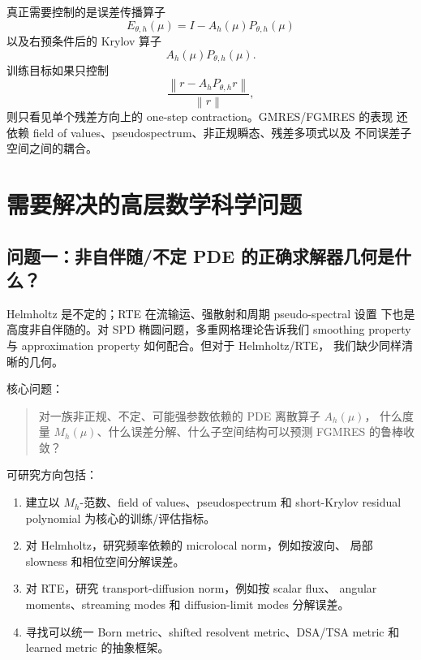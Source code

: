 \documentclass[UTF8,11pt,fontset=fandol]{ctexart}
\newcommand{\norm}[1]{\left\lVert #1 \right\rVert}
\begin{document}
真正需要控制的是误差传播算子
\begin{equation}
  E_{\theta,h}(\mu) = I - A_h(\mu) P_{\theta,h}(\mu)
\end{equation}
以及右预条件后的 Krylov 算子
\begin{equation}
  A_h(\mu) P_{\theta,h}(\mu).
\end{equation}
训练目标如果只控制
\begin{equation}
  \frac{\norm{r-A_hP_{\theta,h}r}}{\norm r},
\end{equation}
则只看见单个残差方向上的 one-step contraction。GMRES/FGMRES 的表现
还依赖 field of values、pseudospectrum、非正规瞬态、残差多项式以及
不同误差子空间之间的耦合。

\section{需要解决的高层数学科学问题}

\subsection{问题一：非自伴随/不定 PDE 的正确求解器几何是什么？}

Helmholtz 是不定的；RTE 在流输运、强散射和周期 pseudo-spectral 设置
下也是高度非自伴随的。对 SPD 椭圆问题，多重网格理论告诉我们 smoothing
property 与 approximation property 如何配合。但对于 Helmholtz/RTE，
我们缺少同样清晰的几何。

核心问题：
\begin{quote}
  对一族非正规、不定、可能强参数依赖的 PDE 离散算子 \(A_h(\mu)\)，
  什么度量 \(M_h(\mu)\)、什么误差分解、什么子空间结构可以预测
  FGMRES 的鲁棒收敛？
\end{quote}

可研究方向包括：
\begin{enumerate}[leftmargin=2em]
  \item 建立以 \(M_h\)-范数、field of values、pseudospectrum 和
  short-Krylov residual polynomial 为核心的训练/评估指标。
  \item 对 Helmholtz，研究频率依赖的 microlocal norm，例如按波向、
  局部 slowness 和相位空间分解误差。
  \item 对 RTE，研究 transport-diffusion norm，例如按 scalar flux、
  angular moments、streaming modes 和 diffusion-limit modes 分解误差。
  \item 寻找可以统一 Born metric、shifted resolvent metric、DSA/TSA
  metric 和 learned metric 的抽象框架。
\end{enumerate}
\end{document}
